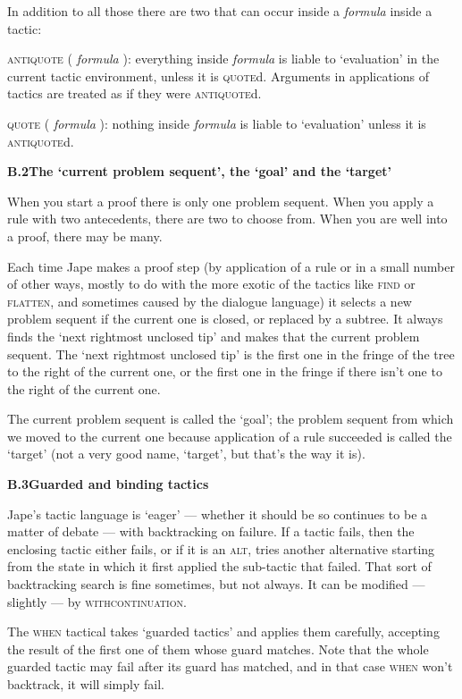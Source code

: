 In addition to all those there are two that can occur inside a \textit{formula} inside a tactic:


\textsc{antiquote} ( \textit{formula} ): everything inside \textit{formula} is liable to `evaluation' in the current tactic environment, unless it is \textsc{quote}d. Arguments in applications of tactics are treated as if they were \textsc{antiquote}d.


\textsc{quote} ( \textit{formula} ): nothing inside \textit{formula} is liable to `evaluation' unless it is \textsc{antiquote}d.


\textbf{{\large B.2\tab The `current problem sequent', the `goal' and the `target'}}


When you start a proof there is only one problem sequent. When you apply a rule with two antecedents, there are two to choose from. When you are well into a proof, there may be many.


Each time Jape makes a proof step (by application of a rule or in a small number of other ways, mostly to do with the more exotic of the tactics like \textsc{find} or \textsc{flatten}, and sometimes caused by the dialogue language) it selects a new problem sequent if the current one is closed, or replaced by a subtree. It always finds the `next rightmost unclosed tip' and makes that the current problem sequent. The `next rightmost unclosed tip' is the first one in the fringe of the tree to the right of the current one, or the first one in the fringe if there isn't one to the right of the current one.


The current problem sequent is called the `goal'; the problem sequent from which we moved to the current one because application of a rule succeeded is called the `target' (not a very good name, `target', but that's the way it is).


\textbf{{\large B.3\tab Guarded and binding tactics}}


Jape's tactic language is `eager' --- whether it should be so continues to be a matter of debate --- with backtracking on failure. If a tactic fails, then the enclosing tactic either fails, or if it is an \textsc{alt}, tries another alternative starting from the state in which it first applied the sub-tactic that failed. That sort of backtracking search is fine sometimes, but not always. It can be modified --- slightly --- by \textsc{withcontinuation}.


The \textsc{when} tactical takes `guarded tactics' and applies them carefully, accepting the result of the first one of them whose guard matches. Note that the whole guarded tactic may fail after its guard has matched, and in that case \textsc{when} won't backtrack, it will simply fail.


